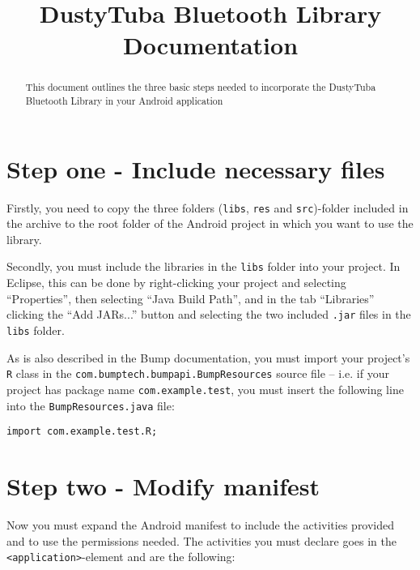 \documentclass[a4paper,11pt]{article}
\title{DustyTuba Bluetooth Library Documentation}
\begin{document}
\maketitle

\begin{abstract}
This document outlines the three basic steps needed to incorporate the DustyTuba Bluetooth Library in your Android application
\end{abstract}




\section{Step one - Include necessary files}
Firstly, you need to copy the three folders (\verb+libs+, \verb+res+ and \verb+src+)-folder included in the archive to the root folder of the Android project in which you want to use the library.

Secondly, you must include the libraries in the \verb+libs+ folder into your project. In Eclipse, this can be done by right-clicking your project and selecting ``Properties'', then selecting ``Java Build Path'', and in the tab ``Libraries'' clicking the ``Add JARs...'' button and selecting the two included {\tt .jar} files in the \verb+libs+ folder.

As is also described in the Bump\texttrademark{} documentation, you must import your project's \verb+R+ class in the {\tt com.bumptech.bumpapi.BumpResources} source file -- i.e. if your project has package name {\tt com.example.test}, you must insert the following line into the {\tt BumpResources.java} file:

\begin{verbatim}
import com.example.test.R;
\end{verbatim}

\clearpage


\section{Step two - Modify manifest}
Now you must expand the Android manifest to include the activities provided and to use the permissions needed. The activities you must declare goes in the \verb+<application>+-element and are the following:
\end{document}
